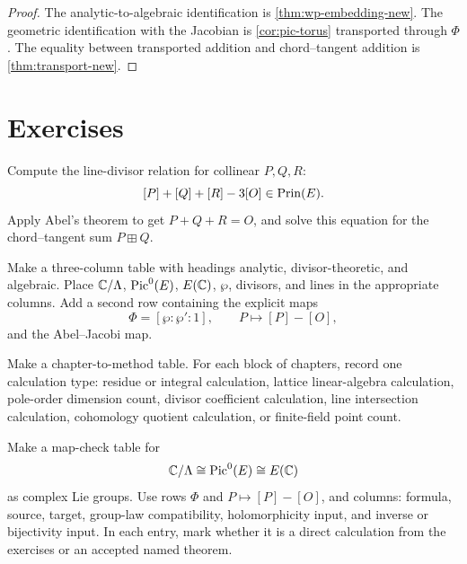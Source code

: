 \begin{proof}
The analytic-to-algebraic identification is \cref{thm:wp-embedding-new}.  The
geometric identification with the Jacobian is \cref{cor:pic-torus} transported
through \(\Phi\).  The equality between transported addition and chord--tangent
addition is \cref{thm:transport-new}.
\end{proof}

\section*{Exercises}

\begin{exercise}
Compute the line-divisor relation for collinear \(P,Q,R\):
\[
  [P]+[Q]+[R]-3[O]\in\operatorname{Prin}(E).
\]
Apply Abel's theorem to get \(P+Q+R=O\), and solve this equation for the
chord--tangent sum \(P\boxplus Q\).
\end{exercise}

\begin{exercise}
Make a three-column table with headings analytic, divisor-theoretic, and
algebraic.  Place \(\mathbb{C}/\Lambda\), \(\operatorname{Pic}^0(E)\), \(E(\mathbb{C})\), \(\wp\), divisors,
and lines in the appropriate columns.  Add a second row containing the explicit
maps
\[
  \Phi=[\wp:\wp':1],\qquad P\mapsto[P]-[O],
\]
and the Abel--Jacobi map.
\end{exercise}

\begin{exercise}
Make a chapter-to-method table.  For each block of chapters, record one
calculation type: residue or integral calculation, lattice linear-algebra
calculation, pole-order dimension count, divisor coefficient calculation, line
intersection calculation, cohomology quotient calculation, or finite-field point
count.
\end{exercise}

\begin{exercise}
Make a map-check table for
\[
  \mathbb{C}/\Lambda\cong\operatorname{Pic}^0(E)\cong E(\mathbb{C})
\]
as complex Lie groups.  Use rows \(\Phi\) and \(P\mapsto[P]-[O]\), and columns:
formula, source, target, group-law compatibility, holomorphicity input, and
inverse or bijectivity input.  In each entry, mark whether it is a direct
calculation from the exercises or an accepted named theorem.
\end{exercise}

